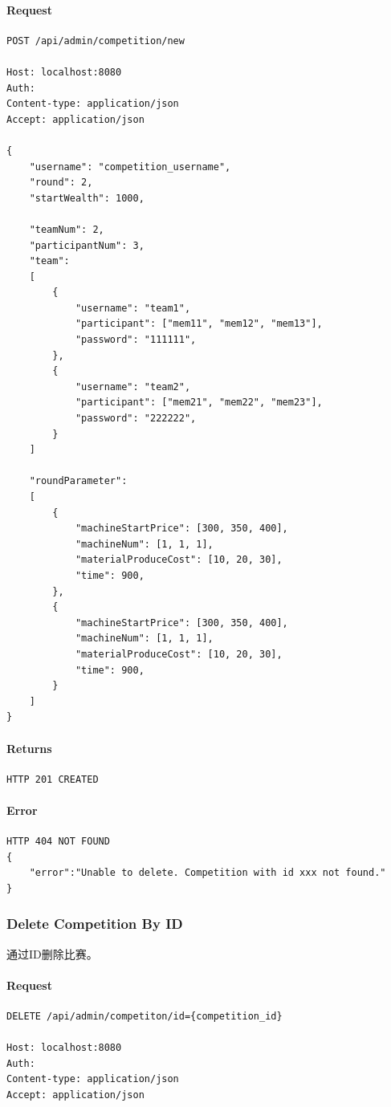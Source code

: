 \documentclass{article}
\begin{document}
\paragraph*{Request}
\begin{lstlisting}
POST /api/admin/competition/new

Host: localhost:8080
Auth:
Content-type: application/json
Accept: application/json

{
    "username": "competition_username",
    "round": 2,
    "startWealth": 1000,

    "teamNum": 2,
    "participantNum": 3,
    "team":
    [
        {
            "username": "team1",
            "participant": ["mem11", "mem12", "mem13"],
            "password": "111111",
        },
        {
            "username": "team2",
            "participant": ["mem21", "mem22", "mem23"],
            "password": "222222",
        }
    ]

    "roundParameter":
    [
        {
            "machineStartPrice": [300, 350, 400],
            "machineNum": [1, 1, 1],
            "materialProduceCost": [10, 20, 30],
            "time": 900,
        },
        {
            "machineStartPrice": [300, 350, 400],
            "machineNum": [1, 1, 1],
            "materialProduceCost": [10, 20, 30],
            "time": 900,
        }
    ]
}
\end{lstlisting}

\paragraph*{Returns}
\begin{lstlisting}
HTTP 201 CREATED

\end{lstlisting}

\paragraph*{Error}
\begin{lstlisting}
HTTP 404 NOT FOUND
{
    "error":"Unable to delete. Competition with id xxx not found."
}
\end{lstlisting}


\subsubsection{Delete Competition By ID}

通过ID删除比赛。

\paragraph*{Request}
\begin{lstlisting}
DELETE /api/admin/competiton/id={competition_id}

Host: localhost:8080
Auth:
Content-type: application/json
Accept: application/json
\end{lstlisting}
\end{document}
